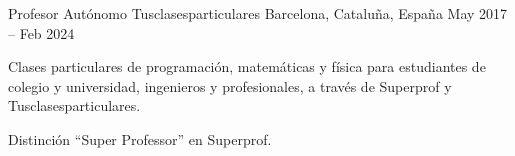 \begin{cventries}
\vspace{3mm}
\cventry
  {Profesor Autónomo}
  {Tusclasesparticulares}
  {Barcelona, Cataluña, España}
  {May 2017 -- Feb 2024}
  {
   \begin{cvitems}
    \item {Clases particulares de programación, matemáticas y física para estudiantes de colegio y universidad, ingenieros y profesionales, a través de Superprof y Tusclasesparticulares.}
    \item {Distinción ``Super Professor'' en Superprof.}
   \end{cvitems}
  }



\end{cventries}
